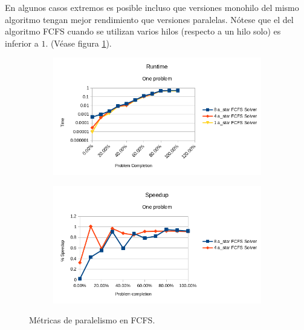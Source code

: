 En algunos casos extremos es posible incluso
que versiones monohilo del mismo algoritmo
tengan mejor rendimiento que versiones paralelas.
Nótese que el  del algoritmo FCFS
cuando se utilizan varios hilos (respecto a un hilo solo)
es inferior a $1$.
(Véase figura \ref{fig:ParalelismoFCFS}).

\begin{figure}[h]
    \begin{subfigure}{.5\textwidth}
        \begin{center}
            \includegraphics[width=\textwidth]{Media/Ch2/Runtime_FCFS_Log.png}
        \end{center}
    \end{subfigure}
    \begin{subfigure}{.5\textwidth}
        \begin{center}
            \includegraphics[width=\textwidth]{Media/Ch2/Speedup_FCFS.png}
        \end{center}
    \end{subfigure}
    \caption{Métricas de paralelismo en FCFS.}
    \label{fig:ParalelismoFCFS}
\end{figure}

